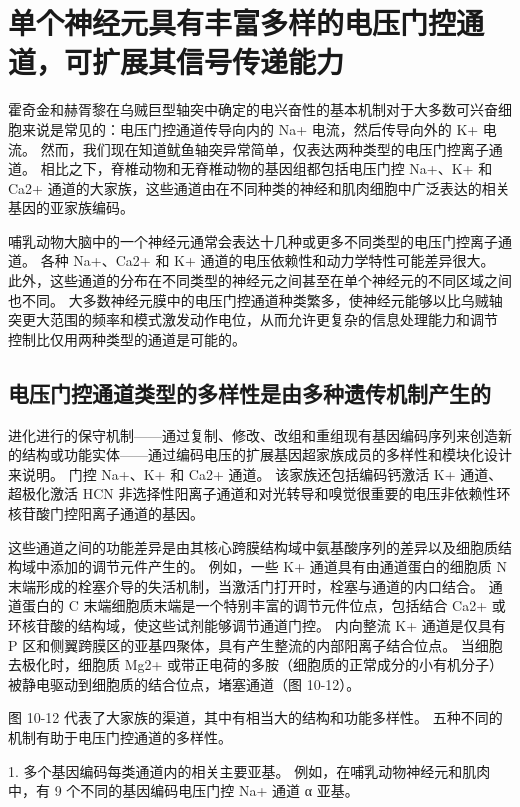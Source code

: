 \section{单个神经元具有丰富多样的电压门控通道，可扩展其信号传递能力}

霍奇金和赫胥黎在乌贼巨型轴突中确定的电兴奋性的基本机制对于大多数可兴奋细胞来说是常见的：电压门控通道传导向内的 Na+ 电流，然后传导向外的 K+ 电流。 
然而，我们现在知道鱿鱼轴突异常简单，仅表达两种类型的电压门控离子通道。 
相比之下，脊椎动物和无脊椎动物的基因组都包括电压门控 Na+、K+ 和 Ca2+ 通道的大家族，这些通道由在不同种类的神经和肌肉细胞中广泛表达的相关基因的亚家族编码。


哺乳动物大脑中的一个神经元通常会表达十几种或更多不同类型的电压门控离子通道。 
各种 Na+、Ca2+ 和 K+ 通道的电压依赖性和动力学特性可能差异很大。 
此外，这些通道的分布在不同类型的神经元之间甚至在单个神经元的不同区域之间也不同。 
大多数神经元膜中的电压门控通道种类繁多，使神经元能够以比乌贼轴突更大范围的频率和模式激发动作电位，从而允许更复杂的信息处理能力和调节 控制比仅用两种类型的通道是可能的。



\subsection{电压门控通道类型的多样性是由多种遗传机制产生的}
进化进行的保守机制——通过复制、修改、改组和重组现有基因编码序列来创造新的结构或功能实体——通过编码电压的扩展基因超家族成员的多样性和模块化设计来说明。 
门控 Na+、K+ 和 Ca2+ 通道。 该家族还包括编码钙激活 K+ 通道、超极化激活 HCN 非选择性阳离子通道和对光转导和嗅觉很重要的电压非依赖性环核苷酸门控阳离子通道的基因。


这些通道之间的功能差异是由其核心跨膜结构域中氨基酸序列的差异以及细胞质结构域中添加的调节元件产生的。 
例如，一些 K+ 通道具有由通道蛋白的细胞质 N 末端形成的栓塞介导的失活机制，当激活门打开时，栓塞与通道的内口结合。 
通道蛋白的 C 末端细胞质末端是一个特别丰富的调节元件位点，包括结合 Ca2+ 或环核苷酸的结构域，使这些试剂能够调节通道门控。 
内向整流 K+ 通道是仅具有 P 区和侧翼跨膜区的亚基四聚体，具有产生整流的内部阳离子结合位点。 
当细胞去极化时，细胞质 Mg2+ 或带正电荷的多胺（细胞质的正常成分的小有机分子）被静电驱动到细胞质的结合位点，堵塞通道（图 10-12）。


图 10-12 代表了大家族的渠道，其中有相当大的结构和功能多样性。 
五种不同的机制有助于电压门控通道的多样性。


1. 多个基因编码每类通道内的相关主要亚基。 
例如，在哺乳动物神经元和肌肉中，有 9 个不同的基因编码电压门控 Na+ 通道 α 亚基。


